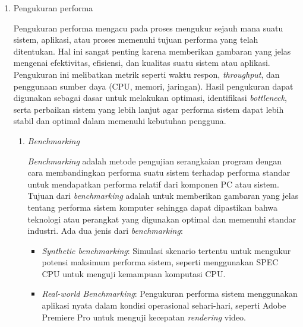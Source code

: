 \documentclass[12pt]{article}
\begin{document}
\begin{enumerate}
    \item {Pengukuran performa}
        \par Pengukuran performa mengacu pada proses mengukur sejauh mana suatu sistem, aplikasi, atau proses memenuhi tujuan performa yang telah ditentukan. Hal ini sangat penting karena memberikan gambaran yang jelas mengenai efektivitas, efisiensi, dan kualitas suatu sistem atau aplikasi. Pengukuran ini melibatkan metrik seperti waktu respon, \textit{throughput}, dan penggunaan sumber daya (CPU, memori, jaringan). Hasil pengukuran dapat digunakan sebagai dasar untuk melakukan optimasi, identifikasi \textit{bottleneck}, serta perbaikan sistem yang lebih lanjut agar performa sistem dapat lebih stabil dan optimal dalam memenuhi kebutuhan pengguna.
        
        \begin{enumerate}
            \item \textit{Benchmarking}
            \par \textit{Benchmarking} adalah metode pengujian serangkaian program dengan cara membandingkan performa suatu sistem terhadap performa standar untuk mendapatkan performa relatif dari komponen PC atau sistem. Tujuan dari \textit{benchmarking} adalah untuk memberikan gambaran yang jelas tentang performa sistem komputer sehingga dapat dipastikan bahwa teknologi atau perangkat yang digunakan optimal dan memenuhi standar industri. Ada dua jenis dari \textit{benchmarking}:
            \begin{itemize}
                \item \textit{Synthetic benchmarking}: Simulasi skenario tertentu untuk mengukur potensi maksimum performa sistem, seperti menggunakan SPEC CPU untuk menguji kemampuan komputasi CPU.
                \item \textit{Real-world Benchmarking}: Pengukuran performa sistem menggunakan aplikasi nyata dalam kondisi operasional sehari-hari, seperti Adobe Premiere Pro untuk menguji kecepatan \textit{rendering} video.
            \end{itemize}
            

\end{enumerate}
\end{enumerate}
\end{document}
